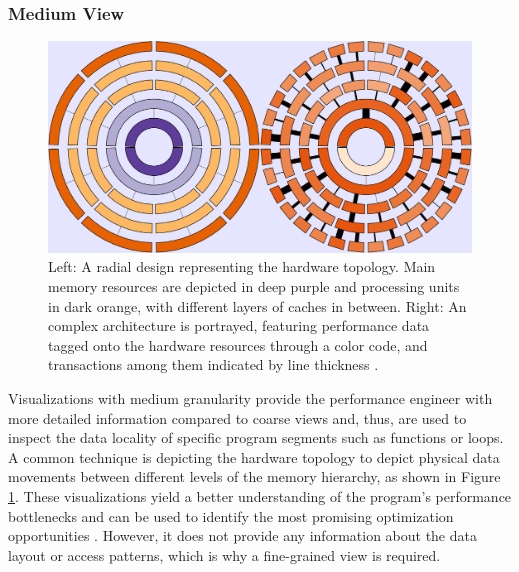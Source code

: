 \subsubsection{Medium View}\label{sec:medium_view}
\begin{figure}
	\centering
	\includegraphics[width=\linewidth]{pictures/memaxes_cache.png}
	\caption{Left: A radial design representing the hardware topology. Main memory resources are depicted in deep purple and processing units in dark orange, with different layers of caches in between. Right: An complex architecture is portrayed, featuring performance data tagged onto the hardware resources through a color code, and transactions among them indicated by line thickness \cite{gimenez2017memaxes}.}
	\label{fig:memaxes_cache}
\end{figure}

Visualizations with medium granularity provide the performance engineer with more detailed information compared to coarse views and, thus, are used to inspect the data locality of specific program segments such as functions or loops. A common technique is depicting the hardware topology to depict physical data movements between different levels of the memory hierarchy, as shown in Figure \ref{fig:memaxes_cache}. These visualizations yield a better understanding of the program's performance bottlenecks and can be used to identify the most promising optimization opportunities \cite{gimenez2017memaxes,choudhury2011abstract}. However, it does not provide any information about the data layout or access patterns, which is why a fine-grained view is required.

